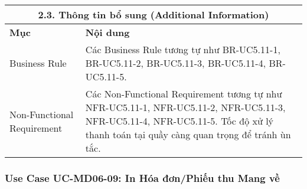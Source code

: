 \begin{longtable}{|m{4cm}|p{11cm}|}
\hline
\multicolumn{2}{|c|}{\textbf{2.3. Thông tin bổ sung (Additional Information)}} \\
\hline
\textbf{Mục} & \textbf{Nội dung} \\
\hline
Business Rule & Các Business Rule tương tự như BR-UC5.11-1, BR-UC5.11-2, BR-UC5.11-3, BR-UC5.11-4, BR-UC5.11-5. \\
\hline
Non-Functional Requirement & Các Non-Functional Requirement tương tự như NFR-UC5.11-1, NFR-UC5.11-2, NFR-UC5.11-3, NFR-UC5.11-4, NFR-UC5.11-5. Tốc độ xử lý thanh toán tại quầy càng quan trọng để tránh ùn tắc. \\
\hline
\end{longtable}

\subsubsection{Use Case UC-MD06-09: In Hóa đơn/Phiếu thu Mang về}

